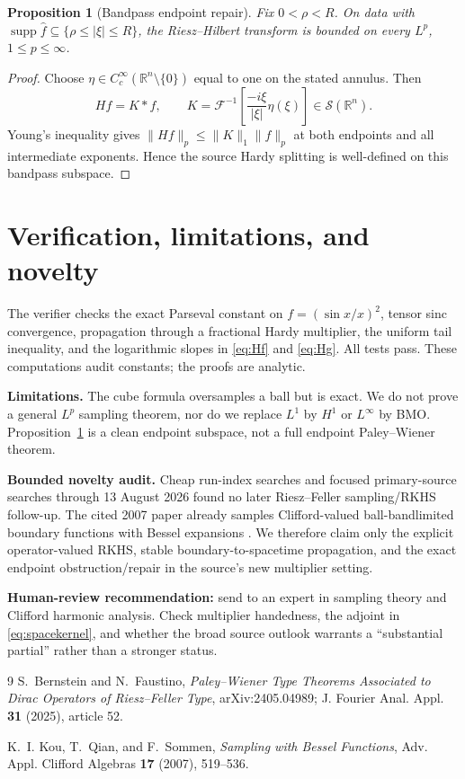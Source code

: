 \documentclass[10pt]{article}
\newtheorem{proposition}[theorem]{Proposition}
\newcommand{\R}{\mathbb R}
\newcommand{\F}{\mathcal F}
\newcommand{\supp}{\operatorname{supp}}
\begin{document}
\begin{proposition}[Bandpass endpoint repair]\label{prop:bandpass}
Fix $0<\rho<R$.  On data with
$\supp\widehat f\subseteq\{\rho\leq|\xi|\leq R\}$, the Riesz--Hilbert
transform is bounded on every $L^p$, $1\leq p\leq\infty$.
\end{proposition}

\begin{proof}
Choose $\eta\in C_c^\infty(\R^n\setminus\{0\})$ equal to one on the stated
annulus.  Then
\[
 Hf=K*f,
 \qquad
 K=\F^{-1}\left[\frac{-i\xi}{|\xi|}\eta(\xi)\right]\in\mathcal S(\R^n).
\]
Young's inequality gives $\|Hf\|_p\leq\|K\|_1\|f\|_p$ at both endpoints and
all intermediate exponents.  Hence the source Hardy splitting is well-defined
on this bandpass subspace.
\end{proof}

\section{Verification, limitations, and novelty}

The verifier checks the exact Parseval constant on $f=(\sin x/x)^2$, tensor
sinc convergence, propagation through a fractional Hardy multiplier, the
uniform tail inequality, and the logarithmic slopes in \eqref{eq:Hf} and
\eqref{eq:Hg}.  All tests pass.  These computations audit constants; the
proofs are analytic.

\textbf{Limitations.}
The cube formula oversamples a ball but is exact.  We do not prove a general
$L^p$ sampling theorem, nor do we replace $L^1$ by $H^1$ or $L^\infty$ by
BMO.  Proposition~\ref{prop:bandpass} is a clean endpoint subspace, not a full
endpoint Paley--Wiener theorem.

\textbf{Bounded novelty audit.}
Cheap run-index searches and focused primary-source searches through 13
August 2026 found no later Riesz--Feller sampling/RKHS follow-up.  The cited
2007 paper already samples Clifford-valued ball-bandlimited boundary
functions with Bessel expansions \cite{KQS}.  We therefore claim only the
explicit operator-valued RKHS, stable boundary-to-spacetime propagation, and
the exact endpoint obstruction/repair in the source's new multiplier setting.

\textbf{Human-review recommendation:} send to an expert in sampling theory and
Clifford harmonic analysis.  Check multiplier handedness, the adjoint in
\eqref{eq:spacekernel}, and whether the broad source outlook warrants a
``substantial partial'' rather than a stronger status.

\begin{thebibliography}{9}
S.~Bernstein and N.~Faustino,
\emph{Paley--Wiener Type Theorems Associated to Dirac Operators of
Riesz--Feller Type}, arXiv:2405.04989; J. Fourier Anal. Appl. \textbf{31}
(2025), article 52.

K.~I. Kou, T.~Qian, and F.~Sommen,
\emph{Sampling with Bessel Functions}, Adv. Appl. Clifford Algebras
\textbf{17} (2007), 519--536.
\end{thebibliography}
\end{document}

